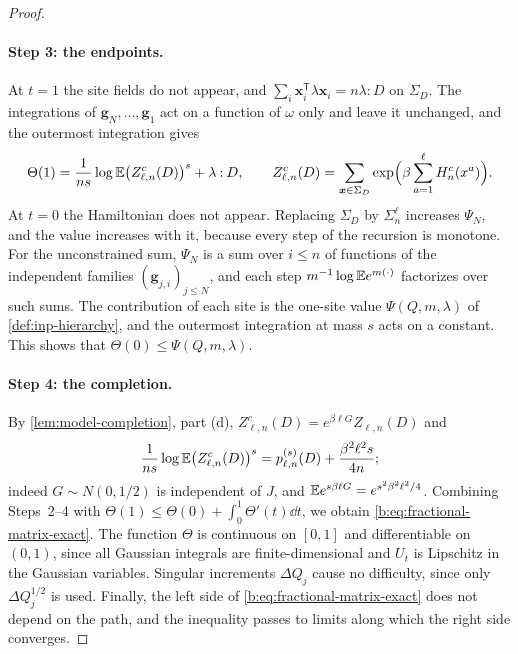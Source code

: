 \begin{proof}
\paragraph{Step 3: the endpoints.} At $t=1$ the site fields do not appear, and $\sum_i\bm x_i^{\mathsf T}\lambda\bm x_i=n\lambda\mathbin{:}D$ on $\Sigma_D$. The integrations of $\mathbf g_N,\dots,\mathbf g_1$ act on a function of $\omega$ only and leave it unchanged, and the outermost integration gives
\[
 \Theta(1)=\frac1{ns}\log\mathbb E\bigl(Z^c_{\ell,n}(D)\bigr)^s+\lambda\mathbin{:}D,\qquad
 Z^c_{\ell,n}(D)=\sum_{\bm x\in\Sigma_D}\exp\Bigl(\beta\sum_{a=1}^\ell H^c_n(x^a)\Bigr).
\]
At $t=0$ the Hamiltonian does not appear. Replacing $\Sigma_D$ by $\Sigma_n^\ell$ increases $\Psi_N$, and the value increases with it, because every step of the recursion is monotone. For the unconstrained sum, $\Psi_N$ is a sum over $i\le n$ of functions of the independent families $(\mathbf g_{j,i})_{j\le N}$, and each step $m^{-1}\log\mathbb E e^{m(\cdot)}$ factorizes over such sums. The contribution of each site is the one-site value $\Psi(Q,m,\lambda)$ of \cref{def:inp-hierarchy}, and the outermost integration at mass $s$ acts on a constant. This shows that $\Theta(0)\le\Psi(Q,m,\lambda)$.

\paragraph{Step 4: the completion.} By \cref{lem:model-completion}, part (d), $Z^c_{\ell,n}(D)=e^{\beta\ell G}Z_{\ell,n}(D)$ and
\[
 \frac1{ns}\log\mathbb E\bigl(Z^c_{\ell,n}(D)\bigr)^s=p^{(s)}_{\ell,n}(D)+\frac{\beta^2\ell^2s}{4n};
\]
indeed $G\sim N(0,1/2)$ is independent of $J$, and $\mathbb E e^{s\beta\ell G}=e^{s^2\beta^2\ell^2/4}$. Combining Steps~2--4 with $\Theta(1)\le\Theta(0)+\int_0^1\Theta'(t)\dd t$, we obtain \eqref{b:eq:fractional-matrix-exact}. The function $\Theta$ is continuous on $[0,1]$ and differentiable on $(0,1)$, since all Gaussian integrals are finite-dimensional and $U_t$ is Lipschitz in the Gaussian variables. Singular increments $\Delta Q_j$ cause no difficulty, since only $\Delta Q_j^{1/2}$ is used. Finally, the left side of \eqref{b:eq:fractional-matrix-exact} does not depend on the path, and the inequality passes to limits along which the right side converges.
\end{proof}

